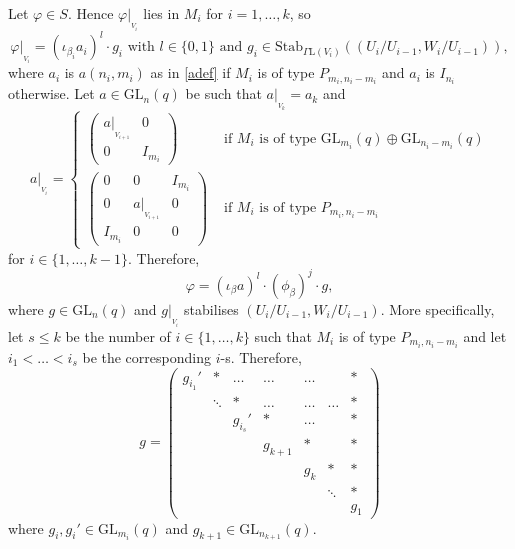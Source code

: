\documentclass[a4paper,reqno,11pt]{amsart}
\theoremstyle{definition}
\theoremstyle{remark}
\numberwithin{equation}{section}
\newcommand{\GaL}{{\Gamma \mathrm{L}}}
\newcommand{\GL}{{\mathrm{GL}}}
\begin{document}
Let $\varphi \in S$. Hence $\varphi|_{_{V_i}}$ lies in $M_i$ for $i=1, \ldots, k$, so $$\varphi|_{_{V_i}}= (\iota_{\beta_i} a_i)^l \cdot g_i \text{ with } l\in \{0,1\} \text{ and } g_i \in \mathrm{Stab}_{\GaL (V_i)}((U_{i}/U_{i-1}, W_{i}/U_{i-1})),$$
where $a_i$ is $a(n_i,m_i)$  as in \eqref{adef} if $M_i$ is of type $P_{m_i, n_i-m_i}$ and $a_i$ is $I_{n_i}$ otherwise. Let $a \in \GL_n(q)$ be such that  $a|_{_{V_k}}=a_k$ and 
\begin{equation}
\label{adefGR}
a|_{_{V_i}}= \begin{cases}
\begin{pmatrix}
a|_{_{V_{i+1}}} & 0\\
0 & I_{m_{i}}
\end{pmatrix} &\text{ if } M_i \text{ is of type } \GL_{m_i}(q) \oplus \GL_{n_i-m_i}(q)\\
\begin{pmatrix}
0 & 0 & I_{m_i}\\
0 & a|_{_{V_{i+1}}} & 0\\
I_{m_i} & 0 & 0
\end{pmatrix} &\text{ if } M_i \text{ is of type } P_{m_i, n_i -m_i}
\end{cases}
\end{equation}
 for $i \in \{1, \ldots, k-1\}.$  Therefore, 
\begin{equation}
\label{GRvarphishape}
\varphi = (\iota_{\beta}a)^l \cdot (\phi_{\beta})^j \cdot g,
\end{equation}
where $g \in \GL_n(q)$ and $g|_{_{V_i}}$ stabilises $(U_{i}/U_{i-1}, W_{i}/U_{i-1}).$ More specifically, let $s \le k$ be the number of $i \in \{1, \ldots, k\}$ such that $M_i$ is of type $P_{m_i, n_i-m_i}$ and let $i_1 < \ldots < i_s$ be the corresponding $i$-s. Therefore,
\begin{equation}
\label{GRguppdiag}
g= \begin{pmatrix}
g_{i_1} '&* &\ldots &\ldots &\ldots & &* \\
 & \ddots &* &\ldots &\ldots& \ldots &* \\
 & &g_{i_s}' &* &\ldots & &* \\
 & & &g_{k+1} &* & &* \\
 & & & & g_k &* & *\\
 & & & & & \ddots &*\\
& & & & & & g_1
\end{pmatrix}
\end{equation} 
where $g_i, g_i' \in \GL_{m_i}(q)$ and $g_{k+1} \in \GL_{n_{k+1}}(q).$
\end{document}
